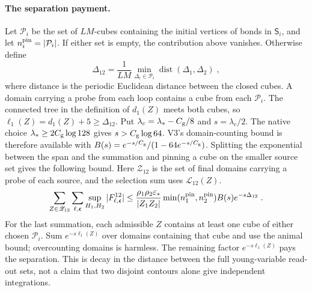 \documentclass[11pt]{article}
\begin{document}
\paragraph{The separation payment.}
Let $\mathcal P_i$ be the set of $LM$-cubes containing the
initial vertices of bonds in $\mathsf S_i$, and let
$n_i^{\rm pin}=|\mathcal P_i|$.
If either set is empty, the contribution above vanishes.
Otherwise define
\begin{equation}\label{eq:c8-fourth-source-separation}
    \Delta_{12}=
        \frac{1}{LM}
            \min_{\Delta_i\in\mathcal P_i}
                \operatorname{dist}(\Delta_1,\Delta_2)\;,
\end{equation}
where distance is the periodic Euclidean distance between
the closed cubes. A domain carrying a probe from each loop
contains a cube from each $\mathcal P_i$. The connected tree
in the definition of $d_1(Z)$ meets both cubes, so
$\ell_1(Z)=d_1(Z)+5\geq\Delta_{12}$.
Put $\lambda_c=\lambda_*-C_{\rm g}/8$ and $s=\lambda_c/2$.
The native choice $\lambda_*\geq2C_{\rm g}\log128$ gives
$s>C_{\rm g}\log64$. V3's domain-counting bound is therefore
available with
$B(s)=e^{-s/C_{\rm g}}/(1-64e^{-s/C_{\rm g}})$.
Splitting the exponential between the span and the summation
and pinning a cube on the smaller source set gives the following
bound. Here $\mathscr Z_{12}$ is the set of final domains
carrying a probe of each source, and the selection sum uses
$\mathscr L_{12}(Z)$.
\begin{equation}\label{eq:c8-fourth-disjoint-root-tail}
    \sum_{Z\in\mathscr Z_{12}}
        \sum_{\ell,\boldsymbol{\mathfrak c}}
            \sup_{H_1,H_2}
                |F_{\ell,\boldsymbol{\mathfrak c}}^{12}|
        \leq
        \frac{\rho_1\rho_2\varepsilon_*}{|Z_1Z_2|}
            \min(n_1^{\rm pin},n_2^{\rm pin})B(s)e^{-s\Delta_{12}}\;.
\end{equation}
For the last summation, each admissible $Z$ contains at least
one cube of either chosen $\mathcal P_i$. Sum
$e^{-s\ell_1(Z)}$ over domains containing that cube and use
the animal bound; overcounting domains is harmless.
The remaining factor $e^{-s\ell_1(Z)}$ pays the separation.
This is decay in the distance between the full young-variable
read-out sets, not a claim that two disjoint contours alone
give independent integrations.
\end{document}
